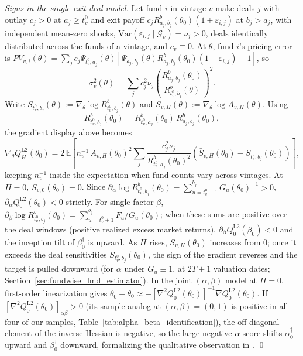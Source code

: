 \emph{Signs in the single-exit deal model.} Let fund $i$ in vintage $v$ make deals $j$ with outlay $c_j > 0$ at $a_j \ge t_v^0$ and exit payoff $c_j R^b_{a_j,b_j}(\theta_0)(1+\varepsilon_{i,j})$ at $b_j > a_j$, with independent mean-zero shocks, $\mathrm{Var}(\varepsilon_{i,j}\mid\mathcal{G}_v) = \nu_j > 0$, deals identically distributed across the funds of a vintage, and $c_v \equiv 0$. At $\theta$, fund $i$'s pricing error is $PV_{v,i}(\theta) = \sum_j c_j \Psi_{t_v^0,a_j}(\theta)[\Psi_{a_j,b_j}(\theta)R^b_{a_j,b_j}(\theta_0)(1+\varepsilon_{i,j}) - 1]$, so
\[
\sigma_v^2(\theta) = \sum_j c_j^2 \nu_j \left(\frac{R^b_{a_j,b_j}(\theta_0)}{R^b_{t_v^0,b_j}(\theta)}\right)^2.
\]
Write $S_{t_v^0,b_j}(\theta) := \nabla_\theta \log R^b_{t_v^0,b_j}(\theta)$ and $\bar S_{v,H}(\theta) := \nabla_\theta \log A_{v,H}(\theta)$. Using
\[
R^b_{t_v^0,b_j}(\theta_0) = R^b_{t_v^0,a_j}(\theta_0)\,R^b_{a_j,b_j}(\theta_0),
\]
the gradient display above becomes
\[
\nabla_\theta Q_H^{\mathrm{L2}}(\theta_0)
= 2\,\mathbb{E}\!\left[n_v^{-1}\, A_{v,H}(\theta_0)^2 \sum_j \frac{c_j^2 \nu_j}{R^b_{t_v^0,a_j}(\theta_0)^2}\left(\bar S_{v,H}(\theta_0) - S_{t_v^0,b_j}(\theta_0)\right)\right],
\]
keeping $n_v^{-1}$ inside the expectation when fund counts vary across vintages. At $H=0$, $\bar S_{v,0}(\theta_0) = 0$. Since $\partial_\alpha \log R^b_{t_v^0,b_j}(\theta_0) = \sum_{u=t_v^0+1}^{b_j} G_u(\theta_0)^{-1} > 0$, $\partial_\alpha Q_0^{\mathrm{L2}}(\theta_0) < 0$ strictly. For single-factor $\beta$, $\partial_\beta \log R^b_{t_v^0,b_j}(\theta_0) = \sum_{u=t_v^0+1}^{b_j} F_u/G_u(\theta_0)$; when these sums are positive over the deal windows (positive realized excess market returns), $\partial_\beta Q_0^{\mathrm{L2}}(\beta_0) < 0$ and the inception tilt of $\beta_0^\dagger$ is upward. As $H$ rises, $\bar S_{v,H}(\theta_0)$ increases from $0$; once it exceeds the deal sensitivities $S_{t_v^0,b_j}(\theta_0)$, the sign of the gradient reverses and the target is pulled downward (for $\alpha$ under $G_u \equiv 1$, at $2T+1$ valuation dates; Section~\ref{sec:fundwise_lmd_estimator}). In the joint $(\alpha,\beta)$ model at $H=0$, first-order linearization gives $\theta_0^\dagger - \theta_0 \approx -[\nabla^2 Q_0^{\mathrm{L2}}(\theta_0)]^{-1}\nabla Q_0^{\mathrm{L2}}(\theta_0)$. If $[\nabla^2 Q_0^{\mathrm{L2}}(\theta_0)]_{\alpha\beta} > 0$ (its sample analog at $(\alpha,\beta) = (0,1)$ is positive in all four of our samples, Table~\ref{tab:alpha_beta_identification}), the off-diagonal element of the inverse Hessian is negative, so the large negative $\alpha$-score shifts $\alpha_0^\dagger$ upward and $\beta_0^\dagger$ downward, formalizing the qualitative observation in \citet[p.~522]{DLP12}. \qed


